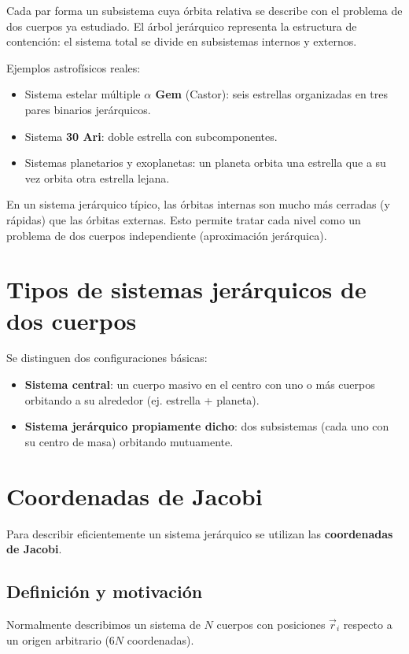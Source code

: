 Cada par forma un subsistema cuya órbita relativa se describe con el problema de dos cuerpos ya estudiado. El árbol jerárquico representa la estructura de contención: el sistema total se divide en subsistemas internos y externos.

Ejemplos astrofísicos reales:
\begin{itemize}
    \item Sistema estelar múltiple \textbf{$\alpha$ Gem} (Castor): seis estrellas organizadas en tres pares binarios jerárquicos.
    \item Sistema \textbf{30 Ari}: doble estrella con subcomponentes.
    \item Sistemas planetarios y exoplanetas: un planeta orbita una estrella que a su vez orbita otra estrella lejana.
\end{itemize}

\begin{importante}
En un sistema jerárquico típico, las órbitas internas son mucho más cerradas (y rápidas) que las órbitas externas. Esto permite tratar cada nivel como un problema de dos cuerpos independiente (aproximación jerárquica).
\end{importante}

\section{Tipos de sistemas jerárquicos de dos cuerpos}
Se distinguen dos configuraciones básicas:
\begin{itemize}
    \item \textbf{Sistema central}: un cuerpo masivo en el centro con uno o más cuerpos orbitando a su alrededor (ej. estrella + planeta).
    \item \textbf{Sistema jerárquico propiamente dicho}: dos subsistemas (cada uno con su centro de masa) orbitando mutuamente.
\end{itemize}

\section{Coordenadas de Jacobi}
Para describir eficientemente un sistema jerárquico se utilizan las \textbf{coordenadas de Jacobi}.

\subsection{Definición y motivación}
Normalmente describimos un sistema de \(N\) cuerpos con posiciones \(\vec{r}_i\) respecto a un origen arbitrario (6\(N\) coordenadas).  

